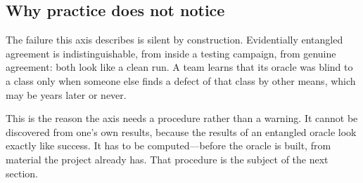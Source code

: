 \subsection{Why practice does not notice}

The failure this axis describes is silent by construction. Evidentially entangled
agreement is indistinguishable, from inside a testing campaign, from genuine
agreement: both look like a clean run. A team learns that its oracle was blind to a
class only when someone else finds a defect of that class by other means, which may
be years later or never.

This is the reason the axis needs a procedure rather than a warning. It cannot be
discovered from one's own results, because the results of an entangled oracle look
exactly like success. It has to be computed---before the oracle is built, from
material the project already has. That procedure is the subject of the next section.
